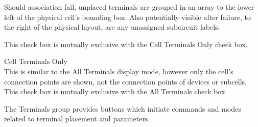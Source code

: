 \begin{description}
Should association fail, unplaced terminals are grouped in an array to
the lower left of the physical cell's bounding box.  Also potentially
visible after failure, to the right of the physical layout, are any
unassigned subcircuit labels.

This check box is mutually exclusive with the {\cb Cell Terminals
Only} check box.

\item{\cb Cell Terminals Only}\\
This is similar to the {\cb All Terminals} display mode, however only
the cell's connection points are shown, not the connection points of
devices or subcells.  This check box is mutually exclusive with the
{\cb All Terminals} check box.
\end{description}

The {\cb Terminals} group provides buttons which initiate commands and
modes related to terminal placement and parameters.

